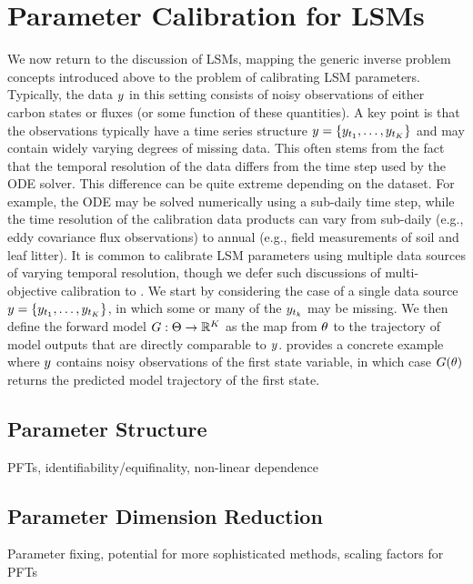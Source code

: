\documentclass[12pt]{article}
\begin{document}
\section{Parameter Calibration for LSMs}
We now return to the discussion of LSMs, mapping the generic inverse problem concepts introduced above to the problem 
of calibrating LSM parameters. Typically, the data $\obs$ in this setting consists of noisy observations of either carbon states 
or fluxes (or some function of these quantities). A key point is that the observations typically have a time series structure 
$\obs = \{\obs_{\indexTime[\firstTimeIdxObs]{\Time}}, \dots, \obs_{\indexTime[\lastTimeIdx]{\Time}}\}$ and may contain widely varying degrees of missing 
data. This often stems from the fact that the temporal resolution of the data differs from the time step used by the ODE solver.
This difference can be quite extreme depending on the dataset. For example, the ODE may be solved numerically using a sub-daily 
time step, while the time resolution of the calibration data products can vary from sub-daily (e.g., eddy covariance flux observations) 
to annual (e.g., field measurements of soil and leaf litter). It is common to calibrate LSM parameters using multiple data sources of 
varying temporal resolution, though we defer such discussions of multi-objective calibration to . 
We start by considering the case of a single data source $\obs = \{\obs_{\indexTime[\firstTimeIdxObs]{\Time}}, \dots, \obs_{\indexTime[\lastTimeIdx]{\Time}}\}$, 
in which some or many of the $\obs_{\indexTime{\Time}}$ may be missing. We then define the forward model 
$\fwd: \parSpace \to \R^{\Ntime}$ as the map from $\Par$ to the trajectory of model outputs that are directly comparable to 
$\obs$.  provides a concrete example where $\obs$ contains noisy observations of the first state variable, 
in which case $\fwd(\Par)$ returns the predicted model trajectory of the first state. 


\subsection{Parameter Structure}
PFTs, identifiability/equifinality, non-linear dependence 

\subsection{Parameter Dimension Reduction}
Parameter fixing, potential for more sophisticated methods, scaling factors for PFTs
\end{document}
